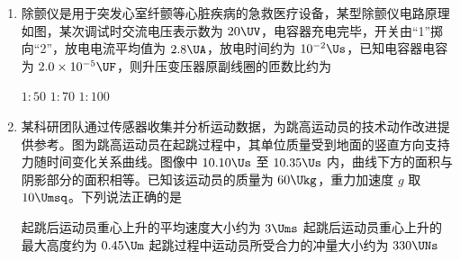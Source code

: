 \documentclass[\gkver]{gaokaozhenti}
\begin{document}
\begin{enumerate}
{得 $N_{A}=\frac{\sqrt{3}}{2}mg$

故选 B。

}

\item
除颤仪是用于突发心室纤颤等心脏疾病的急救医疗设备，某型除颤仪电路原理如图，某次调试时交流电压表示数为 $20\UV$，电容器充电完毕，开关由“1”掷向“2”，放电电流平均值为 $2.8\UA$，放电时间约为 $10^{-2}\Us$，已知电容器电容为 $2.0\times10^{-5}\UF$，则升压变压器原副线圈的匝数比约为


{$1:50$}
{$1:70$}
{$1:100$}


\item
某科研团队通过传感器收集并分析运动数据，为跳高运动员的技术动作改进提供参考。图为跳高运动员在起跳过程中，其单位质量受到地面的竖直方向支持力随时间变化关系曲线。图像中 $10.10\Us$ 至 $10.35\Us$ 内，曲线下方的面积与阴影部分的面积相等。已知该运动员的质量为 $60\Ukg$，重力加速度 $g$ 取 $10\Umsq$。下列说法正确的是


{起跳后运动员重心上升的平均速度大小约为 $3\Ums$}
{起跳后运动员重心上升的最大高度约为 $0.45\Um$}
{起跳过程中运动员所受合力的冲量大小约为 $330\UNs$}


\end{enumerate}
\end{document}
